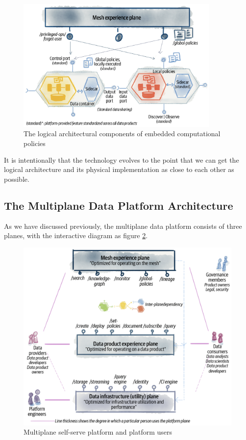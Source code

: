 \documentclass[12pt, a4paper]{book}
\begin{document}
\begin{figure}[h]
	\begin{framed}
		\centering
		\includegraphics[width=10cm]{LogicalComponents.png}
		\caption{The logical architectural components of embedded computational policies}
		\label{LogicalComponents}
	\end{framed}
\end{figure}
\vspace{-.5cm}
It is intentionally that the technology evolves to the point that we can get the logical architecture and its physical implementation as close to each other as possible. \cite{datamesh2022p3}


\subsection{The Multiplane Data Platform Architecture}
As we have discussed previously, the multiplane data platform consists of three planes, with the interactive diagram as figure \ref{multiplane}.

\begin{figure}[h]
	\begin{framed}
		\centering
		\includegraphics[width=12cm]{multiplane.png}
		\caption{Multiplane self-serve platform and platform users}
		\label{multiplane}
	\end{framed}
	\vspace{-.5cm}
\end{figure}
\end{document}
